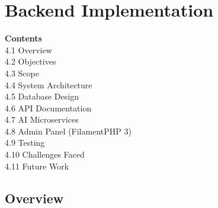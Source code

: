 \chapter{Backend Implementation}

\vspace{-0.5cm}
\begin{center}
\begin{minipage}{0.85\textwidth}
\small
\textbf{Contents}\\[0.3cm]
\hspace*{1cm} 4.1 \quad Overview \dotfill \pageref{sec:ch4overview}\\
\hspace*{1cm} 4.2 \quad Objectives \dotfill \pageref{sec:ch4objectives}\\
\hspace*{1cm} 4.3 \quad Scope \dotfill \pageref{sec:ch4scope}\\
\hspace*{1cm} 4.4 \quad System Architecture \dotfill \pageref{sec:ch4arch}\\
\hspace*{1cm} 4.5 \quad Database Design \dotfill \pageref{sec:ch4db}\\
\hspace*{1cm} 4.6 \quad API Documentation \dotfill \pageref{sec:ch4api}\\
\hspace*{1cm} 4.7 \quad AI Microservices \dotfill \pageref{sec:ch4ai}\\
\hspace*{1cm} 4.8 \quad Admin Panel (FilamentPHP 3) \dotfill \pageref{sec:ch4admin}\\
\hspace*{1cm} 4.9 \quad Testing \dotfill \pageref{sec:ch4testing}\\
\hspace*{1cm} 4.10 \quad Challenges Faced \dotfill \pageref{sec:ch4challenges}\\
\hspace*{1cm} 4.11 \quad Future Work \dotfill \pageref{sec:ch4future}\\
\end{minipage}
\end{center}
\vspace{0.5cm}
\newpage

\section{Overview}
\label{sec:ch4overview}

